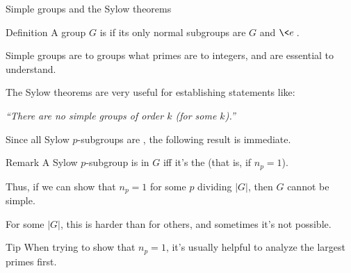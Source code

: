 \documentclass[8pt, handout]{beamer}
\newcommand{\Pause}{}      %
\begin{document}
\begin{frame}{Simple groups and the Sylow theorems} %

  \begin{block}{Definition}
    A group $G$ is  if its only normal subgroups are $G$
    and $\<e\>$.
  \end{block}

  \smallskip\Pause

  Simple groups are to groups what primes are to integers, and are
  essential to understand.
  
  \medskip\Pause

  The Sylow theorems are very useful for establishing statements like:

  \begin{center}
    \emph{``There are no simple groups of order $k$ (for some $k$).''}
  \end{center}

  \Pause

  Since all Sylow $p$-subgroups are , the following
  result is immediate.

  \smallskip
  
  \begin{exampleblock}{Remark}
    A Sylow $p$-subgroup is  in $G$ iff it's the
     (that is, if $n_p=1$).
  \end{exampleblock}
  
  \smallskip\Pause
  
  Thus, if we can show that $n_p=1$ for some $p$ dividing $|G|$,
  then $G$ cannot be simple.

  \medskip\Pause

  For some $|G|$, this is harder than for others, and sometimes it's
  not possible.
  
  \smallskip\Pause
  
  \begin{alertblock}{Tip}
    When trying to show that $n_p=1$, it's usually helpful to
    analyze the largest primes first.
  \end{alertblock}
  
\end{frame}

\end{document}
